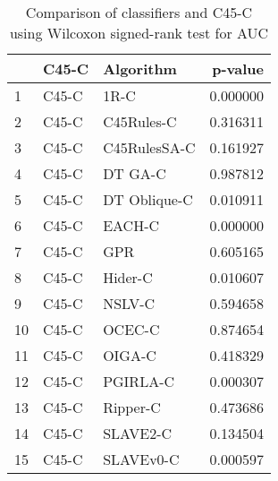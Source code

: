 \begin{table}
\footnotesize
\caption{Comparison of classifiers and C45-C using Wilcoxon signed-rank test for AUC}
\label{tab:C45-C wilcoxon AUC comparison}
\begin{tabular}{lllr}
\hline
 & C45-C & Algorithm & p-value \\
\hline
1 & C45-C & 1R-C & 0.000000 \\
2 & C45-C & C45Rules-C & 0.316311 \\
3 & C45-C & C45RulesSA-C & 0.161927 \\
4 & C45-C & DT GA-C & 0.987812 \\
5 & C45-C & DT Oblique-C & 0.010911 \\
6 & C45-C & EACH-C & 0.000000 \\
7 & C45-C & GPR & 0.605165 \\
8 & C45-C & Hider-C & 0.010607 \\
9 & C45-C & NSLV-C & 0.594658 \\
10 & C45-C & OCEC-C & 0.874654 \\
11 & C45-C & OIGA-C & 0.418329 \\
12 & C45-C & PGIRLA-C & 0.000307 \\
13 & C45-C & Ripper-C & 0.473686 \\
14 & C45-C & SLAVE2-C & 0.134504 \\
15 & C45-C & SLAVEv0-C & 0.000597 \\
\hline
\end{tabular}
\end{table}
